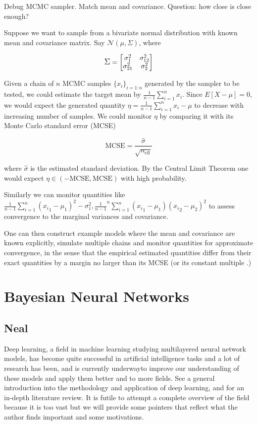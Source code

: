 \documentclass[]{report}
\begin{document}
Debug MCMC sampler. Match mean and covariance. Question: how close is close enough?

Suppose we want to sample from a bivariate normal distribution with known mean and covariance matrix. Say $\mathcal{N}(\mu,\Sigma) $, where 

\begin{displaymath}
\mathlarger{\Sigma} = 
\begin{bmatrix}
\sigma^2_1 &\sigma_{12}^2 \\
\sigma_{21}^2 &\sigma^2_2 \\
\end{bmatrix}
\end{displaymath}

Given a chain of $n$ MCMC samples $\{x_i\}_{i=1:n}$ generated by the sampler to be tested, we could estimate  the target mean by $ \frac{1}{n-1} \sum_{i=1}^ n x_i$. Since $E[X-\mu] = 0$, we would expect the generated quantity $\eta= \frac{1}{n-1} \sum_{i=1}^ n x_i -\mu$ to decrease with increasing number of samples. We could monitor $\eta$ by comparing it with its Monte Carlo standard error (MCSE) 

\[ \text{MCSE} = \frac{\hat{\sigma}}{\sqrt{n_{\text{eff}}}} \]

where $\hat{\sigma}$ is the estimated standard deviation. By the Central Limit Theorem one would expect  $\eta \in (-\text{MCSE},\text{MCSE})$ with high probability. 

Similarly we can monitor quantities like $\frac{1}{n-1} \sum_{i=1}^n ({x_i}_1 -\mu_1)^2 - \sigma^2_1,  \frac{1}{n-1}^n \sum_{i=1}^n ({x_i}_1 - \mu_1)({x_i}_2 - \mu_2)^2 $ to assess convergence to the marginal variances and covariance.

One can then construct example models where the mean and covariance are known explicitly, simulate multiple chains and monitor quantities for approximate convergence, in the sense that the empirical estimated quantities differ from their exact quantities by a margin no larger than its MCSE (or its constant multiple .) 

\chapter{Bayesian Neural Networks}
\section{Neal}

Deep learning, a field in machine learning studying multilayered neural network models, has become quite successful in artificial intelligence tasks and a lot of research has been, and is currently underwayto improve our understanding of these models and apply them better and to more fields. See \cite{Goodfellow-et-al-2016-Book,lecun2015deep} a general introduction into the methodology and application of deep learning, and \cite{schmidhuber2015deep} for an in-depth literature review. It is futile to attempt a complete overview of the field because it is too vast but we will provide some pointers that reflect what the author finds important and some motivations. 
\end{document}
